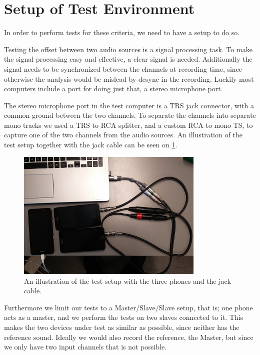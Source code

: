 \section{Setup of Test Environment}\label{sec:test_setup}
In order to perform tests for these criteria, we need to have a setup to do so.

Testing the offset between two audio sources is a signal processing
task. To make the signal processing easy and effective, a clear signal is
needed. Additionally the signal needs to be synchronized between the
channels at recording time, since otherwise the analysis would be
mislead by desync in the recording. Luckily most computers include
a port for doing just that, a stereo microphone port.

The stereo microphone port in the test computer is a \ac{TRS} jack
connector, with a common ground between the two channels. To separate
the channels into separate mono tracks we used a \ac{TRS} to \ac{RCA}
splitter, and a custom \ac{RCA} to mono \ac{TS}, to capture one of the two
channels from the audio sources.
An illustration of the test setup together with the jack cable can be seen on \cref{fig:test_setup}.

\begin{figure}[!bht]
    \centering
    \includegraphics[width=0.8\textwidth]{img/test_setup.png}
    \caption{An illustration of the test setup with the three phones and the jack cable.}\label{fig:test_setup}
\end{figure}

Furthermore we limit our tests to a Master/Slave/Slave setup, that is;
one phone acts as a master, and we perform the tests on two slaves
connected to it. This makes the two devices under test as similar as
possible, since neither has the reference sound.
Ideally we would also record the reference, the Master, but since we only have two input channels that is not possible.

